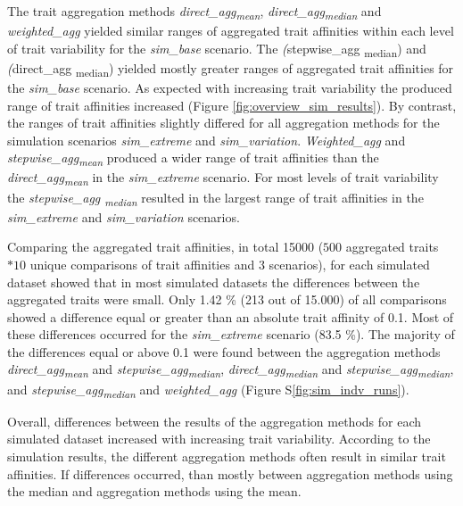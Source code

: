 \documentclass{article}
\begin{document}
The trait aggregation methods \textit{direct\_agg\textsubscript{mean}}, \textit{direct\_agg\textsubscript{median}} and \textit{weighted\_agg} yielded similar ranges of aggregated trait affinities within each level of trait variability for the \textit{sim\_base} scenario. The \textit(stepwise\_agg \textsubscript{median}) and \textit(direct\_agg \textsubscript{median}) yielded mostly greater ranges of aggregated trait affinities for the \textit{sim\_base} scenario. As expected with increasing trait variability the produced range of trait affinities increased (Figure \ref{fig:overview_sim_results}). By contrast, the ranges of trait affinities slightly differed for all aggregation methods for the simulation scenarios \textit{sim\_extreme} and \textit{sim\_variation}. \textit{Weighted\_agg} and \textit{stepwise\_agg\textsubscript{mean}} produced a wider range of trait affinities than the \textit{direct\_agg\textsubscript{mean}} in the \textit{sim\_extreme} scenario. For most levels of trait variability the \textit{stepwise\_agg \textsubscript{median}} resulted in the largest range of trait affinities in the \textit{sim\_extreme} and \textit{sim\_variation} scenarios.

Comparing the aggregated trait affinities, in total 15000 ($500$ aggregated traits $*10$ unique comparisons of trait affinities and $3$ scenarios), for each simulated dataset showed that in most simulated datasets the differences between the aggregated traits were small. Only 1.42 \% (213 out of 15.000) of all comparisons showed a difference equal or greater than an absolute trait affinity of 0.1. Most of these differences occurred for the \textit{sim\_extreme} scenario (83.5 \%). The majority of the differences equal or above 0.1 were found between the aggregation methods \textit{direct\_agg\textsubscript{mean}} and \textit{stepwise\_agg\textsubscript{median}}, \textit{direct\_agg\textsubscript{median}} and \textit{stepwise\_agg\textsubscript{median}}, and \textit{stepwise\_agg\textsubscript{median}} and \textit{weighted\_agg} (Figure S\ref{fig:sim_indv_runs}). 

Overall, differences between the results of the aggregation methods for each simulated dataset increased with increasing trait variability. According to the simulation results, the different aggregation methods often result in similar trait affinities.  If differences occurred, than mostly between aggregation methods using the median and aggregation methods using the mean. 
\end{document}
